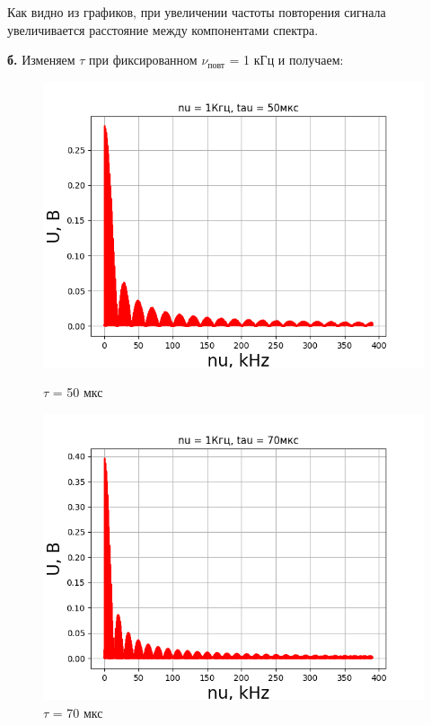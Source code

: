 \documentclass[a4paper,12pt]{article}
\theoremstyle{definition}
\begin{document}
\begin{enumerate}
Как видно из графиков, при увеличении частоты повторения сигнала увеличивается
расстояние между компонентами спектра.


\textbf{б.} Изменяем $\tau$ при фиксированном $\nu_\text{повт}$ = 1 кГц и получаем:

\begin{figure}[h!] 
\centering %
\begin{minipage}[t]{0.45\linewidth} %
    \centering
    \includegraphics[width=\linewidth]{nu=1kHztau=50mks.png} 
    \caption*{$\tau$ = 50 мкс} %
\end{minipage}
\hfill
\begin{minipage}[t]{0.45\linewidth} %
    \centering
    \includegraphics[width=\linewidth]{nu=1kHztau=70mks.png} 
    \caption*{$\tau$ = 70 мкс}
\end{minipage}


\end{figure}
\end{enumerate}
\end{document}
